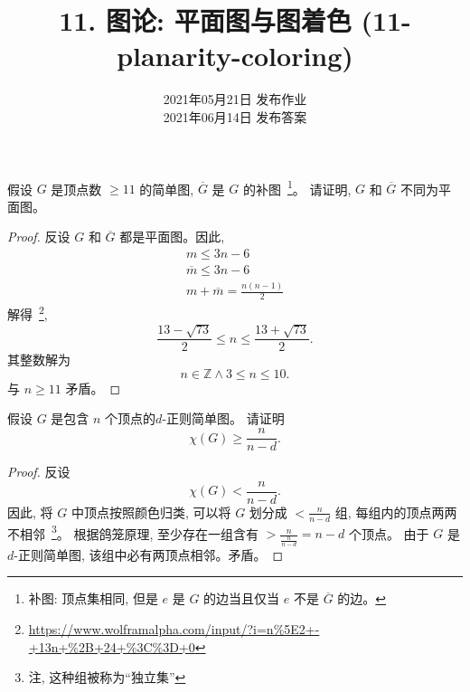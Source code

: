 \documentclass[a4paper, justified]{tufte-handout}
\title{11. 图论: 平面图与图着色 (11-planarity-coloring)}
\date{2021年05月21日 发布作业 \\ 2021年06月14日 发布答案}
\begin{document}
\maketitle
\noplagiarism %
\begin{abstract}
\end{abstract}
\beginrequired

\begin{problem}
  假设 $G$ 是顶点数 $\ge 11$ 的简单图, $\overline{G}$ 是 $G$ 的补图~\footnote{
    补图: 顶点集相同, 但是 $e$ 是 $G$ 的边当且仅当 $e$ 不是 $\overline{G}$ 的边。
  }。
  请证明, $G$ 和 $\overline{G}$ 不同为平面图。
\end{problem}

\begin{proof}
  反设 $G$ 和 $\overline{G}$ 都是平面图。因此,
  \begin{align}
    m \le 3n - 6 \\
    \overline{m} \le 3n - 6 \\
    m + \overline{m} = \frac{n(n-1)}{2}
  \end{align}
  解得~\footnote{\url{https://www.wolframalpha.com/input/?i=n\%5E2+-+13n+\%2B+24+\%3C\%3D+0}},
  \[
    \frac{13 -\sqrt{73}}{2} \le n \le \frac{13 + \sqrt{73}}{2}.
  \]
  其整数解为
  \[
    n \in \mathbb{Z} \land 3 \le n \le 10.
  \]
  与 $n \ge 11$ 矛盾。
\end{proof}

\begin{problem}
  假设 $G$ 是包含 $n$ 个顶点的$d$-正则简单图。
  请证明
  \[
    \chi(G) \ge \frac{n}{n-d}.
  \]
\end{problem}

\begin{proof}
  反设
  \[
    \chi(G) < \frac{n}{n-d}.
  \]
  因此, 将 $G$ 中顶点按照颜色归类, 可以将 $G$ 划分成 $< \frac{n}{n-d}$ 组,
  每组内的顶点两两不相邻~\footnote{注, 这种组被称为``独立集''}。
  根据鸽笼原理, 至少存在一组含有 $> \frac{n}{\frac{n}{n-d}} = n - d$ 个顶点。
  由于 $G$ 是 $d$-正则简单图, 该组中必有两顶点相邻。矛盾。
\end{proof}
\end{document}
